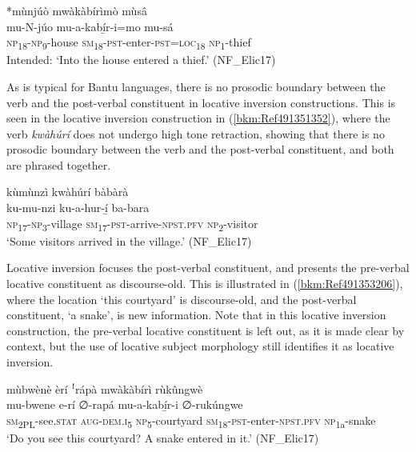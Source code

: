 \ea
\label{bkm:Ref491353170}
*mùnjúò mwàkàbírìmò mùsâ\\
\gll mu-N-júo    mu-a-kabí̲r-i=mo    mu-sá\\
\textsc{np}\textsubscript{18}-\textsc{np}\textsubscript{9}-house  \textsc{sm}\textsubscript{18}-\textsc{pst}-enter-\textsc{pst}=\textsc{loc}\textsubscript{18}  \textsc{np}\textsubscript{1}-thief\\
\glt Intended: ‘Into the house entered a thief.’ (NF\_Elic17)
\z

As is typical for Bantu languages, there is no prosodic boundary between the verb and the post-verbal constituent in locative inversion constructions. This is seen in the locative inversion construction in (\ref{bkm:Ref491351352}), where the verb \textit{kwàhúrí} does not undergo high tone retraction, showing that there is no prosodic boundary between the verb and the post-verbal constituent, and both are phrased together.

\ea
\label{bkm:Ref491351352}
kùmùnzì kwàhúrí bàbàrà\\
\gll ku-mu-nzi    ku-a-hur-í̲      ba-bara\\
\textsc{np}\textsubscript{17}-\textsc{np}\textsubscript{3}-village  \textsc{sm}\textsubscript{17}-\textsc{pst}-arrive-\textsc{npst}.\textsc{pfv}  \textsc{np}\textsubscript{2}-visitor\\
\glt ‘Some visitors arrived in the village.’ (NF\_Elic17)
\z

Locative inversion focuses the post-verbal constituent, and presents the pre-verbal locative constituent as discourse-old. This is illustrated in (\ref{bkm:Ref491353206}), where the location ‘this courtyard’ is discourse-old, and the post-verbal constituent, ‘a snake’, is new information. Note that in this locative inversion construction, the pre-verbal locative constituent is left out, as it is made clear by context, but the use of locative subject morphology still identifies it as locative inversion.

\ea
\label{bkm:Ref491353206}
mùbwènè èrí ꜝrápà mwàkàbírì rùkûngwè\\
\gll mu-bwene    e-rí    ∅-rapá mu-a-kabí̲r-i      ∅-rukúngwe \\
\textsc{sm}\textsubscript{2PL}-see.\textsc{stat}  \textsc{aug}-\textsc{dem}.\textsc{i}\textsubscript{5}  \textsc{np}\textsubscript{5}-courtyard
\textsc{sm}\textsubscript{18}-\textsc{pst}-enter-\textsc{npst}.\textsc{pfv}  \textsc{np}\textsubscript{1a}-snake\\
\glt ‘Do you see this courtyard? A snake entered in it.’ (NF\_Elic17)
\z

